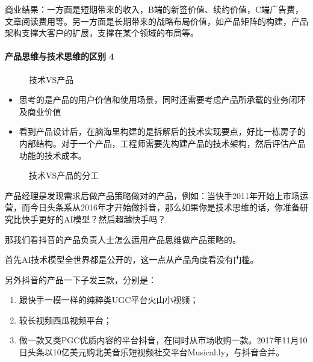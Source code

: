 \documentclass[letterpaper,11pt,english]{sphinxmanual}
\begin{document}
商业结果：一方面是短期带来的收入，B端的新签价值、续约价值，C端广告费，文章阅读费用等。另一方面是长期带来的战略布局价值，如产品矩阵的构建，产品架构支撑大客户的扩展，支撑在某个领域的布局等。


\paragraph{产品思维与技术思维的区别 4\sphinxfootnotemark[60]}
\label{\detokenize{chapter_introduction/PM:id21}}%
\begin{footnotetext}[60]\sphinxAtStartFootnote
{}
%
\end{footnotetext}\ignorespaces 
\begin{figure}[H]
\centering
\capstart

\noindent{}
\caption{技术VS产品}\label{\detokenize{chapter_introduction/PM:id33}}\end{figure}
\begin{itemize}
\item {} 
思考的是产品的用户价值和使用场景，同时还需要考虑产品所承载的业务闭环及商业价值

\item {} 
看到产品设计后，在脑海里构建的是拆解后的技术实现要点，好比一栋房子的内部结构。对于一个产品，工程师需要先构建产品的技术架构，然后评估产品功能的技术成本。

\end{itemize}

\begin{figure}[H]
\centering
\capstart

\noindent{}
\caption{技术VS产品的分工}\label{\detokenize{chapter_introduction/PM:id34}}\end{figure}

产品经理是发现需求后做产品策略做对的产品，例如：当快手2011年开始上市场运营，而今日头条系从2016年才开始做抖音，那么如果你是技术思维的话，你准备研究比快手更好的AI模型？然后超越快手吗？

那我们看抖音的产品负责人士怎么运用产品思维做产品策略的。

首先AI技术模型全世界都是公开的，这一点从产品角度看没有门槛。

另外抖音的产品一下子发三款，分别是：
\begin{enumerate}
%
\item {} 
跟快手一模一样的纯粹类UGC平台火山小视频；

\item {} 
较长视频西瓜视频平台；

\item {} 
做一款又类PGC优质内容的平台抖音，在同时从市场收购一款。2017年11月10日头条以10亿美元购北美音乐短视频社交平台Musical.ly，与抖音合并。

\end{enumerate}
\end{document}
